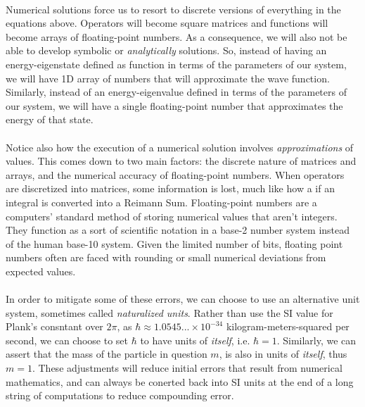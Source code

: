 \documentclass[12pt,letterpaper]{book}
\begin{document}
\paragraph*{}Numerical solutions force us to resort to discrete versions of everything in the equations above. Operators will become square matrices  and functions will become arrays of floating-point numbers. As a consequence, we will also not be able to develop symbolic or \textit{analytically} solutions. So, instead of having an energy-eigenstate defined as function in terms of the parameters of our system, we will have 1D array of numbers that will approximate the wave function. Similarly, instead of an energy-eigenvalue defined in terms of the parameters of our system, we will have a single floating-point number that approximates the energy of that state.

\paragraph*{}Notice also how the execution of a numerical solution involves \textit{approximations} of values. This comes down to two main factors: the discrete nature of matrices and arrays, and the numerical accuracy of floating-point numbers. When operators are discretized into matrices, some information is lost, much like how a if an integral is converted into a Reimann Sum. Floating-point numbers are a computers' standard method of storing numerical values that aren't integers. They function as a sort of scientific notation in a base-2 number system instead of the human base-10 system. Given the limited number of bits, floating point numbers often are faced with rounding or small numerical deviations from expected values.

\paragraph*{}In order to mitigate some of these errors, we can choose to use an alternative unit system, sometimes called \textit{naturalized units}. Rather than use the SI value for Plank's consntant over $2\pi$, as $\hbar \approx 1.0545...\times 10^{-34}$ kilogram-meters-squared per second, we can choose to set $\hbar$ to have units of \textit{itself}, i.e. $\hbar = 1$. Similarly, we can assert that the mass of the particle in question $m$, is also in units of \textit{itself}, thus $m = 1$.  These adjustments will reduce initial errors that result from numerical mathematics, and can always be conerted back into SI units at the end of a long string of computations to reduce compounding error.
\end{document}
